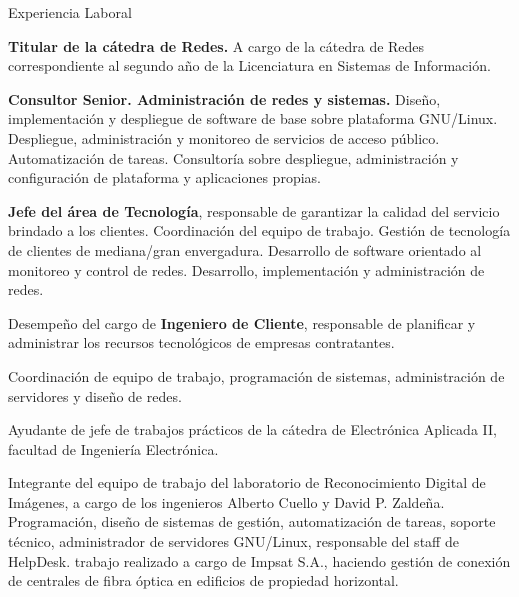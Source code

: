 \begin{rubric}{Experiencia Laboral}

 {\bfseries Titular de la cátedra de Redes.} A cargo de la cátedra
	de Redes correspondiente al segundo año de la Licenciatura en Sistemas de Información.

 {\bfseries Consultor Senior. Administración de redes y sistemas.}
	Diseño, implementación y despliegue de software de base sobre plataforma GNU/Linux. Despliegue, administración 
	y monitoreo de servicios de acceso público. Automatización de tareas. Consultoría sobre despliegue, administración 
	y configuración de plataforma y aplicaciones propias.

 {\bfseries Jefe del área de Tecnología}, responsable de garantizar 
	la calidad  del servicio brindado a los clientes. Coordinación del equipo de trabajo. Gestión 
	de tecnología de clientes de mediana/gran envergadura. Desarrollo de software orientado al 
	monitoreo y control de redes. Desarrollo, implementación y administración de redes.

 Desempeño del cargo de {\bfseries Ingeniero de Cliente}, 
	responsable de planificar y administrar los recursos tecnológicos de empresas 
	contratantes.

 Coordinación de equipo de trabajo, programación 
	de sistemas, administración de servidores y diseño de redes.
 
 Ayudante de jefe de trabajos prácticos de la
	cátedra de Electrónica Aplicada II, facultad de Ingeniería Electrónica.

  Integrante del equipo de trabajo
		del la\-bo\-ra\-to\-rio de Reconocimiento Digital de Imágenes, a cargo de 
		los ingenieros Alberto Cuello y David P. Zaldeña.
 Programación, diseño de sistemas de gestión,
	automatización de tareas, soporte técnico, administrador de servidores GNU/Linux, responsable
	del staff de HelpDesk.
 trabajo realizado a cargo de Impsat S.A., haciendo gestión
	de conexión de centrales de fibra óptica en edificios de propiedad horizontal.
 
\end{rubric}

